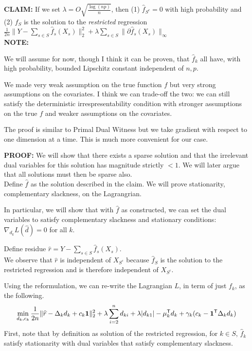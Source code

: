 \documentclass{article}
\begin{document}
\textbf{CLAIM:}
If we set $\lambda = O \sqrt{\frac{\log (np) }{ n }}$, then (1) $\hat{f}_{S^c} = 0$ with high probability and (2) $\hat{f}_S$ is the solution to the \emph{restricted} regression $\frac{1}{2n} \| Y - \sum_{s \in S} \hat{f}_s(X_s) \|_2^2 + \lambda\sum_{s \in S} \| \partial \hat{f}_s(X_s)\|_\infty$\\

\textbf{NOTE:} 
\begin{packed_enum}
\item We will assume for now, though I think it can be proven, that $\hat{f}_k$ all have, with high probability, bounded Lipschitz constant independent of $n, p$.
\item We made very weak assumption on the true function $f$ but very strong assumptions on the covariates. I think we can trade-off the two: we can still satisfy the deterministic irrespresentability condition with stronger assumptions on the true $f$ and weaker assumptions on the covariates.
\item The proof is similar to Primal Dual Witness but we take gradient with respect to one dimension at a time. This is much more convenient for our case.
\end{packed_enum}

{\bf PROOF:}
We will show that there exists a sparse solution and that the irrelevant dual variables for this solution has magnitude strictly $< 1$. We will later argue that all solutions must then be sparse also.\\

Define $\hat{f}$ as the solution described in the claim. We will prove stationarity, complementary slackness, on the Lagrangrian.

In particular, we will show that with $\hat{f}$ as constructed, we can set the dual variables to satisfy complementary slackness and stationary conditions: $\nabla_{d_k} L(\hat{d})  = 0$ for all $k$.

Define residue $\hat{r} = Y - \sum_{s \in S} \hat{f}_s(X_s)$. \\

We observe that $\hat{r}$ is independent of $X_{S^c}$ because $\hat{f}_{S}$ is the solution to the restricted regression and is therefore independent of $X_{S^c}$. 

Using the reformulation, we can re-write the Lagrangian $L$, in term of just $f_k$, as the following.
\[
\min_{d_k, c_k}  \frac{1}{2n} \| \widehat{r} - \Delta_k d_k + c_k \mathbf{1} \|_2^2 + \lambda \sum_{i=2}^n d_{ki} + \lambda|d_{k1}| - \mu_k^{\mathsf{T}} d_k + \gamma_k (c_k - \mathbf{1}^{\mathsf{T}}\Delta_k d_k)
\]
First, note that by definition as solution of the restricted regression, for $k \in S$, $\hat{f}_k$ satisfy stationarity with dual variables that satisfy complementary slackness. \\
\end{document}

